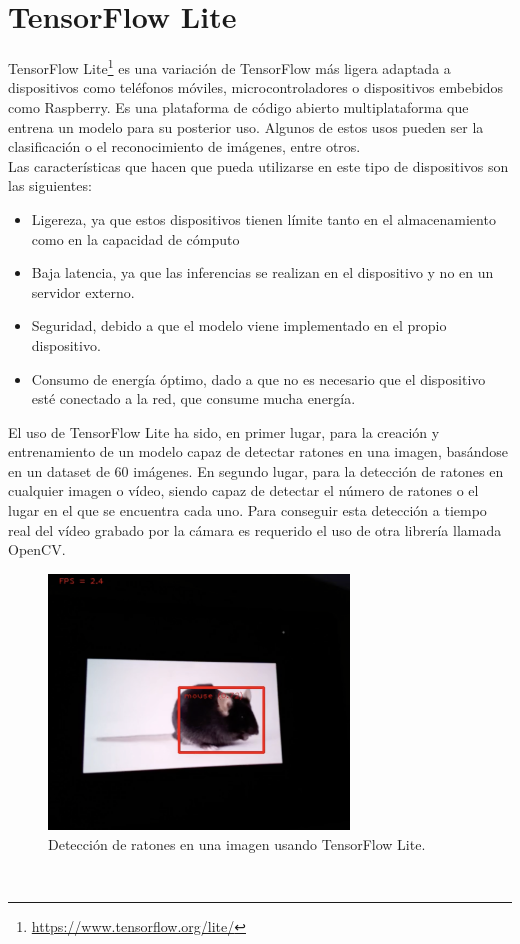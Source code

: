 \section{TensorFlow Lite}
\label{sec:tensor}
TensorFlow Lite\footnote{\url{https://www.tensorflow.org/lite/}} es una variación de TensorFlow más ligera adaptada a dispositivos como teléfonos móviles, microcontroladores o dispositivos embebidos como Raspberry. Es una plataforma de código abierto multiplataforma que entrena un modelo para su posterior uso. Algunos de estos usos pueden ser la clasificación o el reconocimiento de imágenes, entre otros.\\
Las características que hacen que pueda utilizarse en este tipo de dispositivos son las siguientes:
\begin{itemize}
\item{Ligereza}, ya que estos dispositivos tienen límite tanto en el almacenamiento como en la capacidad de cómputo
\item{Baja latencia}, ya que las inferencias se realizan en el dispositivo y no en un servidor externo. 
\item{Seguridad}, debido a que el modelo viene implementado en el propio dispositivo.
\item{Consumo de energía óptimo,} dado a que no es necesario que el dispositivo esté conectado a la red, que consume mucha energía.
\end{itemize}
El uso de TensorFlow Lite ha sido, en primer lugar, para la creación y entrenamiento de un modelo capaz de detectar ratones en una imagen, basándose en un dataset de 60 imágenes. En segundo lugar, para la detección de ratones en cualquier imagen o vídeo, siendo capaz de detectar el número de ratones o el lugar en el que se encuentra cada uno. Para conseguir esta detección a tiempo real del vídeo grabado por la cámara es requerido el uso de otra librería llamada OpenCV.\\
\begin{figure} [h!]
  \begin{center}
    \includegraphics[width=8cm]{figs/raton-detectado}
  \end{center}
  \caption{Detección de ratones en una imagen usando TensorFlow Lite.}
  \label{fig:tesla}
\end{figure}\\

